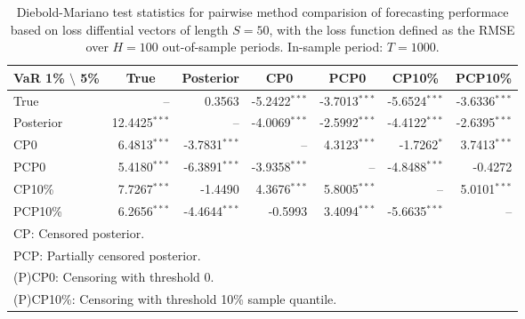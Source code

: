 { \renewcommand{\arraystretch}{1.2} 
\begin{table} 
\center 
\begin{tabular}{l | rrr rrr} 
VaR 1\% $\setminus$ 5\% & \multicolumn{1}{c}{True} & \multicolumn{1}{c}{Posterior} & \multicolumn{1}{c}{CP0} & \multicolumn{1}{c}{PCP0} & \multicolumn{1}{c}{CP10\%} & \multicolumn{1}{c}{PCP10\%} \\ \hline 
True &    --\phantom{$^{***}$} & 0.3563\phantom{$^{***}$} & -5.2422$^{***}$ & -3.7013$^{***}$ & -5.6524$^{***}$ & -3.6336$^{***}$  \\ 
Posterior & 12.4425$^{***}$ &    --\phantom{$^{***}$} & -4.0069$^{***}$ & -2.5992$^{***}$ & -4.4122$^{***}$ & -2.6395$^{***}$  \\ 
CP0 & 6.4813$^{***}$ & -3.7831$^{***}$ &    --\phantom{$^{***}$} & 4.3123$^{***}$ & -1.7262$^{*}$\phantom{$^{**}$} & 3.7413$^{***}$  \\ 
PCP0 & 5.4180$^{***}$ & -6.3891$^{***}$ & -3.9358$^{***}$ &    --\phantom{$^{***}$} & -4.8488$^{***}$ & -0.4272\phantom{$^{***}$}  \\ 
CP10\% & 7.7267$^{***}$ & -1.4490\phantom{$^{***}$} & 4.3676$^{***}$ & 5.8005$^{***}$ &    --\phantom{$^{***}$} & 5.0101$^{***}$  \\ 
PCP10\% & 6.2656$^{***}$ & -4.4644$^{***}$ & -0.5993\phantom{$^{***}$} & 3.4094$^{***}$ & -5.6635$^{***}$ &    --\phantom{$^{***}$}  \\ 
\hline 
\multicolumn{7}{l}{\footnotesize{CP: Censored posterior.}}  \\ 
\multicolumn{7}{l}{\footnotesize{PCP: Partially censored posterior.}} \\ 
\multicolumn{7}{l}{\footnotesize{(P)CP0: Censoring with threshold 0.}} \\ 
\multicolumn{7}{l}{\footnotesize{(P)CP10\%: Censoring with threshold 10\% sample quantile.}}  \\ 
\end{tabular}
 \caption{Diebold-Mariano test statistics for  pairwise method comparision of forecasting performace based on loss diffential vectors of length $S = 50$, with the loss function defined as the RMSE over $H=100$ out-of-sample periods. In-sample period: $T = 1000$.} 
\label{tab:arch1_DM_T_1000}  
\end{table}
}